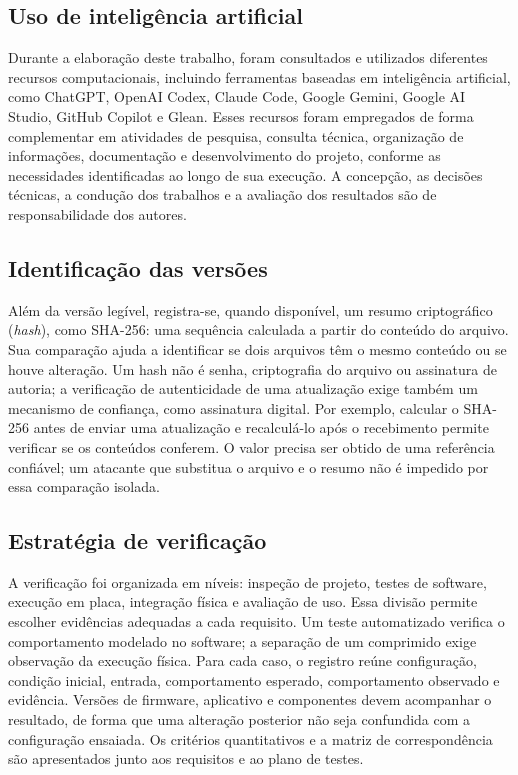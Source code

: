 \subsection{Uso de inteligência artificial}
Durante a elaboração deste trabalho, foram consultados e utilizados diferentes recursos computacionais, incluindo ferramentas baseadas em inteligência artificial, como ChatGPT, OpenAI Codex, Claude Code, Google Gemini, Google AI Studio, GitHub Copilot e Glean.
Esses recursos foram empregados de forma complementar em atividades de pesquisa, consulta técnica, organização de informações, documentação e desenvolvimento do projeto, conforme as necessidades identificadas ao longo de sua execução.
A concepção, as decisões técnicas, a condução dos trabalhos e a avaliação dos resultados são de responsabilidade dos autores.
\subsection{Identificação das versões}
Além da versão legível, registra-se, quando disponível, um resumo criptográfico (\emph{hash}), como SHA-256: uma sequência calculada a partir do conteúdo do arquivo. Sua comparação ajuda a identificar se dois arquivos têm o mesmo conteúdo ou se houve alteração. Um hash não é senha, criptografia do arquivo ou assinatura de autoria; a verificação de autenticidade de uma atualização exige também um mecanismo de confiança, como assinatura digital. \cite{NIST_SHA} Por exemplo, calcular o SHA-256 antes de enviar uma atualização e recalculá-lo após o recebimento permite verificar se os conteúdos conferem. O valor precisa ser obtido de uma referência confiável; um atacante que substitua o arquivo e o resumo não é impedido por essa comparação isolada.


\subsection{Estratégia de verificação}
A verificação foi organizada em níveis: inspeção de projeto, testes de software, execução em placa, integração física e avaliação de uso.
Essa divisão permite escolher evidências adequadas a cada requisito.
Um teste automatizado verifica o comportamento modelado no software; a separação de um comprimido exige observação da execução física.
Para cada caso, o registro reúne configuração, condição inicial, entrada, comportamento esperado, comportamento observado e evidência.
Versões de firmware, aplicativo e componentes devem acompanhar o resultado, de forma que uma alteração posterior não seja confundida com a configuração ensaiada.
Os critérios quantitativos e a matriz de correspondência são apresentados junto aos requisitos e ao plano de testes.
